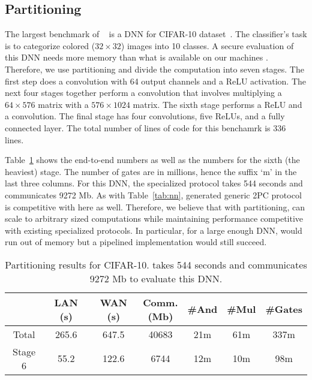 \subsection{Partitioning}
\label{sec:pipeeval}
The largest benchmark of \minion~\cite{minionn} is a DNN for CIFAR-10
dataset~\cite{cifar}. 
The classifier's task is to categorize colored ($32\times 32$) images
into 10 classes. A secure evaluation of this DNN needs more memory
than what is available
on our machines . Therefore, we use partitioning and divide the
computation into seven stages. 
The first step does a convolution with 64 output channels and a ReLU
activation. The next four stages together perform a convolution that
involves multiplying a $64\times 576$ matrix with a 
$576\times 1024$ matrix. The sixth stage performs a ReLU and a
convolution. The final stage has four convolutions, five ReLUs, and a
fully connected layer. The total number of lines of \tool code for
this benchamrk is 336 lines. 


Table~\ref{tab:cifar} shows the end-to-end numbers as
well as the numbers for the sixth (the heaviest) stage. 
The number of gates are in millions, hence the suffix `m' in the last
three columns.
For this DNN, the specialized \minion protocol takes 544 seconds and
communicates 9272 Mb.
As with Table~\ref{tab:nn}, \tool generated generic 2PC protocol is
competitive with \minion here as well. Therefore,
we believe that with partitioning, \tool can scale to arbitrary sized
computations while maintaining performance
competitive with existing specialized protocols. In particular, for a
large enough DNN, \minion would run
out of memory but a pipelined \tool implementation would still
succeed. 

\begin{table}
\begin{tabular}{c|c|c|c |c|c|c}
           &  LAN (s) & WAN (s) & \thead{Comm. \\ (Mb)}  & \#And & \#Mul & \#Gates \\
\hline
Total      &  265.6       & 647.5        & 40683       & 21m    & 61m    &  337m  \\
\hline
Stage 6    &  55.2        & 122.6        & 6744        & 12m    & 10m   &  98m  \\
\hline
\end{tabular}

 \caption{Partitioning results for CIFAR-10. \minion takes 544 seconds and communicates 9272 Mb to evaluate this DNN.}
 \label{tab:cifar} 
\end{table}

